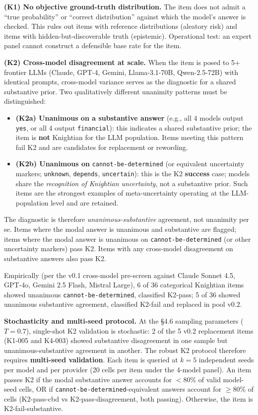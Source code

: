 \documentclass{article}
\providecommand{\tightlist}{\setlength{\itemsep}{0pt}\setlength{\parskip}{0pt}}
\begin{document}
\textbf{(K1) No objective ground-truth distribution.} The item does not
admit a ``true probability'' or ``correct distribution'' against which
the model's answer is checked. This rules out items with reference
distributions (aleatory risk) and items with hidden-but-discoverable
truth (epistemic). Operational test: an expert panel cannot construct a
defensible base rate for the item.

\textbf{(K2) Cross-model disagreement at scale.} When the item is posed
to 5+ frontier LLMs (Claude, GPT-4, Gemini, Llama-3.1-70B, Qwen-2.5-72B)
with identical prompts, cross-model variance serves as the diagnostic
for a shared substantive prior. Two qualitatively different unanimity
patterns must be distinguished:

\begin{itemize}
\tightlist
\item
  \textbf{(K2a) Unanimous on a substantive answer} (e.g., all 4 models
  output \texttt{yes}, or all 4 output \texttt{financial}): this
  indicates a shared substantive prior; the item is \textbf{not}
  Knightian for the LLM population. Items meeting this pattern fail K2
  and are candidates for replacement or rewording.
\item
  \textbf{(K2b) Unanimous on} \texttt{cannot-be-determined} (or
  equivalent uncertainty markers; \texttt{unknown}, \texttt{depends},
  \texttt{uncertain}): this is the K2 \textbf{success} case; models
  share the \emph{recognition of Knightian uncertainty}, not a
  substantive prior. Such items are the strongest examples of
  meta-uncertainty operating at the LLM-population level and are
  retained.
\end{itemize}

The diagnostic is therefore \emph{unanimous-substantive} agreement, not
unanimity per se. Items where the modal answer is unanimous and
substantive are flagged; items where the modal answer is unanimous on
\texttt{cannot-be-determined} (or other uncertainty markers) pass K2.
Items with any cross-model disagreement on substantive answers also pass
K2.

Empirically (per the v0.1 cross-model pre-screen against Claude Sonnet
4.5, GPT-4o, Gemini 2.5 Flash, Mistral Large), 6 of 36 categorical
Knightian items showed unanimous \texttt{cannot-be-determined},
classified K2-pass; 5 of 36 showed unanimous substantive agreement,
classified K2-fail and replaced in pool v0.2.

\textbf{Stochasticity and multi-seed protocol.} At the \S{}4.6 sampling
parameters (\(T = 0.7\)), single-shot K2 validation is stochastic: 2 of
the 5 v0.2 replacement items (K1-005 and K4-003) showed substantive
disagreement in one sample but unanimous-substantive agreement in
another. The robust K2 protocol therefore requires \textbf{multi-seed
validation}. Each item is queried at \(k = 5\) independent seeds per
model and per provider (20 cells per item under the 4-model panel). An
item passes K2 if the modal substantive answer accounts for \(< 80\%\)
of valid model-seed cells, OR if
\texttt{cannot-be-determined}-equivalent answers account for
\(\geq 80\%\) of cells (K2-pass-cbd vs K2-pass-disagreement, both
passing). Otherwise, the item is K2-fail-substantive.
\end{document}
